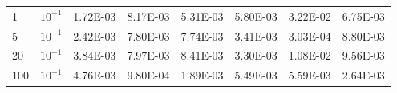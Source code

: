 \documentclass[mathserif, aspectratio=169]{beamer}
\begin{document}
\begin{frame}[fragile]
\begin{center}
{\begin{tabular}{|p{1cm}|p{1cm}|c|c|c|c|c|c|}
			  \hline
			  1        & $10^{-1}$ & 1.72E-03	& 8.17E-03	& 5.31E-03	& 5.80E-03  & 3.22E-02  & 6.75E-03  \\
			  5        & $10^{-1}$ & 2.42E-03	& 7.80E-03	& 7.74E-03	& 3.41E-03  & 3.03E-04  & 8.80E-03   \\
			  20       & $10^{-1}$ & 3.84E-03	& 7.97E-03	& 8.41E-03	& 3.30E-03  & 1.08E-02  & 9.56E-03   \\
			  100      & $10^{-1}$ & 4.76E-03	& 9.80E-04	& 1.89E-03	& 5.49E-03  & 5.59E-03  & 2.64E-03   \\
			  \hline
			\end{tabular}}

\end{center}
\end{frame}
\end{document}
